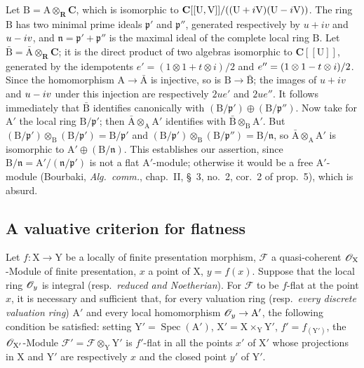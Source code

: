 \begin{env}[11.7.5]
Let $\mathrm{B}=\mathrm{A}\otimes_\mathbf{R}\mathbf{C}$, which is isomorphic to $\mathbf{C}[[\mathrm{U},\mathrm{V}]]/((\mathrm{U}+i\mathrm{V})(\mathrm{U}- i\mathrm{V}))$.
The ring $\mathrm{B}$ has two minimal prime ideals $\mathfrak{p}'$ and $\mathfrak{p}''$, generated respectively by $u+iv$ and $u- iv$, and $\mathfrak{n}=\mathfrak{p}'+\mathfrak{p}''$ is the maximal ideal of the complete local ring $\mathrm{B}$.
Let $\bar{\mathrm{B}}=\bar{\mathrm{A}}\otimes_\mathbf{R}\mathbf{C}$; it is the direct product of two algebras isomorphic to $\mathbf{C}[[\mathrm{U}]]$, generated by the idempotents $e'=(1\otimes 1+t\otimes i)/2$ and $e''=(1\otimes 1- t\otimes i)/2$.
Since the homomorphism $\mathrm{A}\to\bar{\mathrm{A}}$ is injective, so is $\mathrm{B}\to\bar{\mathrm{B}}$; the images of $u+iv$ and $u- iv$ under this injection are respectively $2ue'$ and $2ue''$.
It follows immediately that $\bar{\mathrm{B}}$ identifies canonically with $(\mathrm{B}/\mathfrak{p}')\oplus(\mathrm{B}/\mathfrak{p}'')$.
Now take for $\mathrm{A}'$ the local ring $\mathrm{B}/\mathfrak{p}'$; then $\bar{\mathrm{A}}\otimes_\mathrm{A}\mathrm{A}'$ identifies with $\bar{\mathrm{B}}\otimes_\mathrm{B}\mathrm{A}'$.
But $(\mathrm{B}/\mathfrak{p}')\otimes_\mathrm{B}(\mathrm{B}/\mathfrak{p}')=\mathrm{B}/\mathfrak{p}'$ and $(\mathrm{B}/\mathfrak{p}')\otimes_\mathrm{B}(\mathrm{B}/\mathfrak{p}'')=\mathrm{B}/\mathfrak{n}$, so $\bar{\mathrm{A}}\otimes_\mathrm{A}\mathrm{A}'$ is isomorphic to $\mathrm{A}'\oplus(\mathrm{B}/\mathfrak{n})$.
This establishes our assertion, since $\mathrm{B}/\mathfrak{n}=\mathrm{A}'/(\mathfrak{n}/\mathfrak{p}')$ is not a flat $\mathrm{A}'$-module; otherwise it would be a free $\mathrm{A}'$-module (Bourbaki, \emph{Alg.\ comm.}, chap.~II, \S~3, no.~2, cor.~2 of prop.~5), which is absurd.
\end{env}

\subsection{A valuative criterion for flatness}
\label{subsection:IV.11.8}

\begin{theorem}[11.8.1]
\label{IV.11.8.1}
Let $f:\mathrm{X}\to\mathrm{Y}$ be a locally of finite presentation morphism, $\mathscr{F}$ a quasi-coherent $\mathscr{O}_\mathrm{X}$-Module of finite presentation, $x$ a point of $\mathrm{X}$, $y=f(x)$.
Suppose that the local ring $\mathscr{O}_y$ is integral \textup{(resp.\ \emph{reduced and Noetherian})}.
For $\mathscr{F}$ to be $f$-flat at the point $x$, it is necessary and sufficient that, for every valuation ring \textup{(resp.\ \emph{every discrete valuation ring})} $\mathrm{A}'$ and every local homomorphism $\mathscr{O}_y\to\mathrm{A}'$, the following condition be satisfied: setting $\mathrm{Y}'=\operatorname{Spec}(\mathrm{A}')$, $\mathrm{X}'=\mathrm{X}\times_\mathrm{Y}\mathrm{Y}'$, $f'=f_{(\mathrm{Y}')}$, the $\mathscr{O}_{\mathrm{X}'}$-Module $\mathscr{F}'=\mathscr{F}\otimes_\mathrm{Y}\mathrm{Y}'$ is $f'$-flat in all the points $x'$ of $\mathrm{X}'$ whose projections in $\mathrm{X}$ and $\mathrm{Y}'$ are respectively $x$ and the closed point $y'$ of $\mathrm{Y}'$.
\end{theorem}

